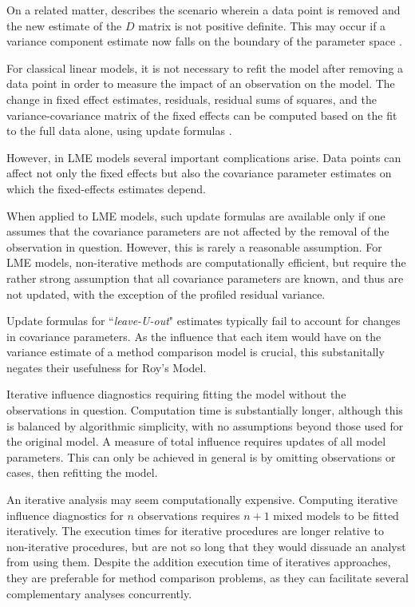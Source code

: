 \documentclass[12pt, a4paper]{report}
\theoremstyle{plain}
\theoremstyle{definition}
\theoremstyle{remark}
\begin{document}
On a related matter, \citet{schabenberger} describes the scenario wherein a data point is removed and the new estimate of the $D$ matrix is not positive definite. This may occur if a variance component
	estimate now falls on the boundary of the parameter space \citep{schabenberger}. 
	
For classical linear models, it is not necessary to refit the model after removing a data point in order to measure the impact of an observation on the model. The change in fixed effect estimates, residuals, residual sums of squares, and the variance-covariance matrix of the fixed effects can be computed based on the fit to the full data alone, using update formulas \citep{sherman, hager1989}.
	
	
However, in LME models several important complications arise. Data points can affect not only the fixed effects but also the covariance parameter estimates on which the fixed-effects estimates depend.
	
When applied to LME models, such update formulas are available only if one assumes that the covariance parameters are not affected by the removal of the observation in question. However, this is rarely a reasonable assumption.
	For LME models, non-iterative methods are computationally efficient, but require the rather strong assumption that all 
	covariance parameters are known, and thus are not updated, with the exception of the profiled residual variance.
	
	Update formulas for ``\textit{leave-U-out}" estimates typically fail to account for changes in covariance parameters.  As the influence that each item would have on the variance estimate of a method comparison model is crucial, this substanitally negates their usefulness for Roy's Model.
	
Iterative influence diagnostics requiring fitting the model without the observations in question. Computation time is substantially longer, although this is balanced by algorithmic simplicity, with no assumptions beyond those used for the original model. A measure of total influence requires updates of all model parameters. This can only be achieved in general is by omitting observations or cases, then refitting the model. 
	
	
An iterative analysis may seem computationally expensive. Computing iterative influence diagnostics for $n$ observations requires $n+1$ mixed models to be fitted iteratively.
	The execution times for iterative procedures are longer relative to non-iterative procedures, but are not so long that they would dissuade an analyst from using them.
	Despite the addition execution time of iteratives
	approaches, they are preferable for method comparison problems, as they can facilitate several complementary analyses concurrently. 
	
\end{document}
